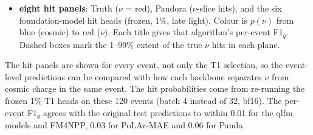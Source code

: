 \documentclass[11pt,a4paper]{article}
\newcommand{\code}[1]{\texttt{\small #1}}
\begin{document}
\begin{itemize}
\begin{itemize}
    \begin{itemize}
      \item 10 of the 13 are out-of-AV $\nu$ with at most 16 $\nu$ hits, so there is little or no light.
      \item 3 are in-AV $\nu$ whose event has no beam-time flash in \code{opflash\_table}: the only flashes are at $-59$ and 3404\,$\mu$s, and one is 1.1\,$\mu$s early.
    \end{itemize}
  \end{itemize}
  \item \textbf{eight hit panels}: Truth ($\nu$ = red), Pandora ($\nu$-slice hits), and the six foundation-model hit heads (frozen, 1\%, late light). Colour is $p(\nu)$ from blue (cosmic) to red ($\nu$). Each title gives that algorithm's per-event F1$_q$. Dashed boxes mark the 1--99\% extent of the true $\nu$ hits in each plane.
\end{itemize}
The hit panels are shown for every event, not only the T1 selection, so the event-level predictions can be compared with how each backbone separates $\nu$ from cosmic charge in the same event. The hit probabilities come from re-running the frozen 1\% T1 heads on these 120 events (batch 4 instead of 32, bf16). The per-event F1$_q$ agrees with the original test predictions to within 0.01 for the qlfm models and FM4NPP, 0.03 for PoLAr-MAE and 0.06 for Panda.

\end{document}
